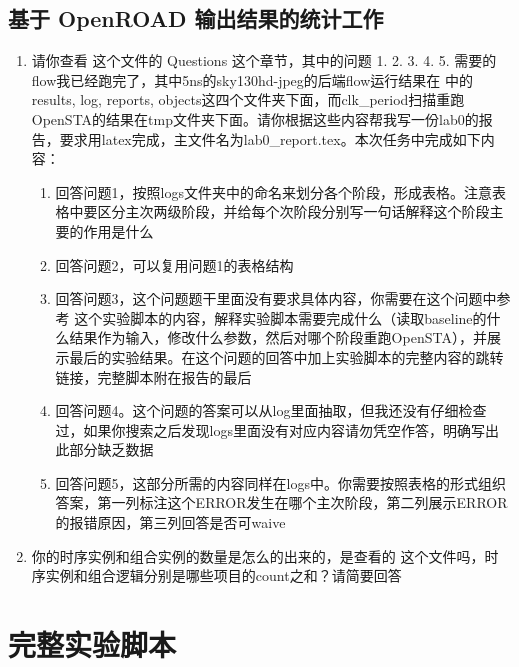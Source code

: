 \documentclass[UTF8,a4paper,11pt,fontset=fandol]{ctexart}
\begin{document}
\subsection{基于 OpenROAD 输出结果的统计工作}
\begin{enumerate}
    \item 请你查看  这个文件的 Questions 这个章节，其中的问题 1. 2. 3. 4. 5. 需要的flow我已经跑完了，其中5ns的sky130hd-jpeg的后端flow运行结果在  中的 results, log, reports, objects这四个文件夹下面，而clk\_period扫描重跑OpenSTA的结果在tmp文件夹下面。请你根据这些内容帮我写一份lab0的报告，要求用latex完成，主文件名为lab0\_report.tex。本次任务中完成如下内容：

    \begin{enumerate}
        \item 回答问题1，按照logs文件夹中的命名来划分各个阶段，形成表格。注意表格中要区分主次两级阶段，并给每个次阶段分别写一句话解释这个阶段主要的作用是什么
        \item 回答问题2，可以复用问题1的表格结构
        \item 回答问题3，这个问题题干里面没有要求具体内容，你需要在这个问题中参考  这个实验脚本的内容，解释实验脚本需要完成什么（读取baseline的什么结果作为输入，修改什么参数，然后对哪个阶段重跑OpenSTA），并展示最后的实验结果。在这个问题的回答中加上实验脚本的完整内容的跳转链接，完整脚本附在报告的最后
        \item 回答问题4。这个问题的答案可以从log里面抽取，但我还没有仔细检查过，如果你搜索之后发现logs里面没有对应内容请勿凭空作答，明确写出此部分缺乏数据
        \item 回答问题5，这部分所需的内容同样在logs中。你需要按照表格的形式组织答案，第一列标注这个ERROR发生在哪个主次阶段，第二列展示ERROR的报错原因，第三列回答是否可waive
    \end{enumerate}

    \item 你的时序实例和组合实例的数量是怎么的出来的，是查看的  这个文件吗，时序实例和组合逻辑分别是哪些项目的count之和？请简要回答
\end{enumerate}


\section{完整实验脚本}\label{app:script}
\end{document}
